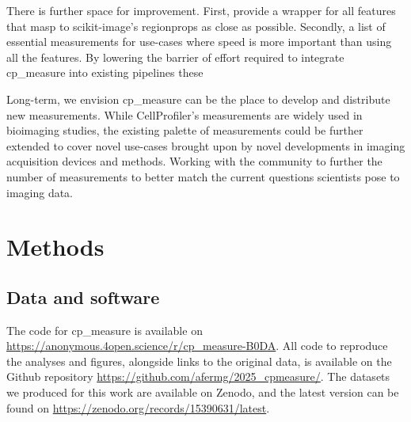 \documentclass{article}
\begin{document}
There is further space for improvement. First, provide a wrapper for all features that masp to scikit-image's regionprops as close as possible. Secondly, a list of essential measurements for use-cases where speed is more important than using all the features. By lowering the barrier of effort required to integrate cp\_measure into existing pipelines these 

Long-term, we envision cp\_measure can be the place to develop and distribute new measurements. While CellProfiler's measurements are widely used in bioimaging studies, the existing palette of measurements could be further extended to cover novel use-cases brought upon by novel developments in imaging acquisition devices and methods. Working with the community to further the number of measurements to better match the current questions scientists pose to imaging data.
\section{Methods}
\label{sec:org91ddb3a}
\subsection{Data and software}
\label{sec:orgf44b7cd}
The code for cp\_measure is available on \url{https://anonymous.4open.science/r/cp\_measure-B0DA}. All code to reproduce the analyses and figures, alongside links to the original data, is available on the Github repository \url{https://github.com/afermg/2025\_cpmeasure/}. The datasets we produced for this work are available on Zenodo, and the latest version can be found on \url{https://zenodo.org/records/15390631/latest}.



\end{document}
